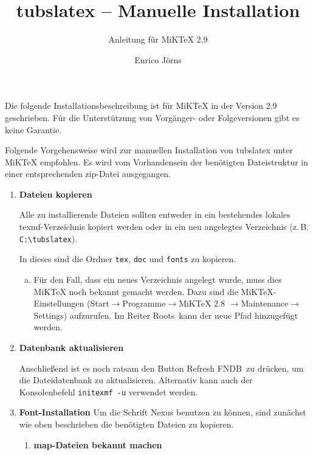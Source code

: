 \documentclass[12pt]{scrartcl}
\title{tubslatex -- Manuelle Installation}
\subtitle{Anleitung für MiKTeX 2.9}
\author{Enrico Jörns}
\begin{document}
\maketitle

Die folgende Installationsbeschreibung ist für MiKTeX in der Version 2.9
geschrieben. Für die Unterstützung von Vorgänger- oder Folgeversionen gibt
es keine Garantie.

Folgende Vorgehensweise wird zur manuellen Installation von tubslatex unter
MiKTeX empfohlen. Es wird vom Vorhandensein der benötigten Dateistruktur in
einer entsprechenden zip-Datei ausgegangen.

\begin{enumerate}
  \item {\bfseries Dateien kopieren}
  
    Alle zu installierende Dateien sollten entweder in ein bestehendes lokales
    texmf-Verzeichnis kopiert werden oder in ein neu angelegtes Verzeichnis
    (z.\,B. \lstinline{C:\tubslatex}).
    
    In dieses sind die Ordner \lstinline{tex}, \lstinline{doc} und 
    \lstinline{fonts} zu kopieren.
    
    \begin{enumerate}[a)]
      \item {\bfseries }
        
        Für den Fall, dass ein neues Verzeichnis angelegt wurde,
        muss dies MiKTeX noch bekannt gemacht werden.
        Dazu sind die MiKTeX-Einstellungen (Start$\to$Programme$\to$MiKTeX 2.8 
        $\to$Maintenance$\to$Settings) aufzurufen.
        Im Reiter \glqq Roots\grqq\ kann der neue Pfad hinzugefügt werden.
    \end{enumerate}
  \item {\bfseries Datenbank aktualisieren}
    
    Anschließend ist es noch ratsam den Button \glqq Refresh FNDB\grqq\
    zu drücken, um die Dateidatenbank zu aktualisieren. Alternativ kann auch 
    der Konsolenbefehl \lstinline{initexmf -u} verwendet werden.
    
  \item {\bfseries Font-Installation}
    Um die Schrift Nexus benutzen zu können, sind zunächst wie oben beschrieben
    die benötigten Dateien zu kopieren.
    
    \begin{enumerate}

      \item {\bfseries map-Dateien bekannt machen}


\end{enumerate}
\end{enumerate}
\end{document}
